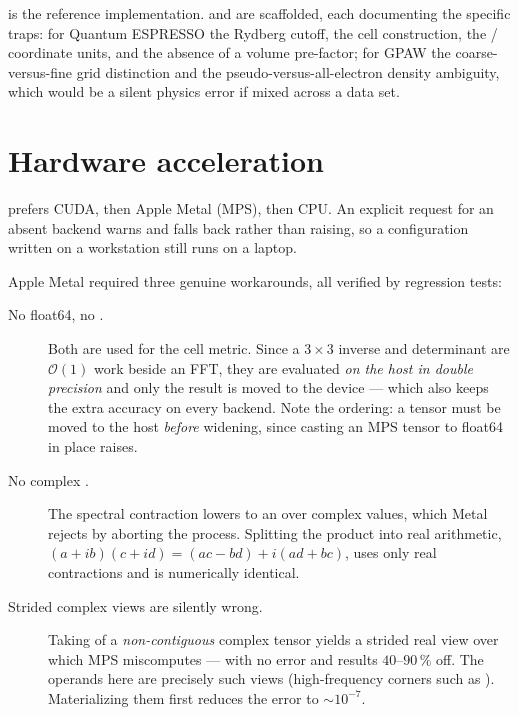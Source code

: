  is the reference implementation.
 and  are scaffolded, each
documenting the specific traps: for Quantum ESPRESSO the Rydberg cutoff,
the  cell construction, the / coordinate
units, and the absence of a volume pre-factor; for GPAW the coarse-versus-fine
grid distinction and the pseudo-versus-all-electron density ambiguity, which
would be a silent physics error if mixed across a data set.

\section{Hardware acceleration}
\label{sec:hardware}

 prefers CUDA, then Apple Metal (MPS), then CPU. An explicit request for an absent backend warns and falls
back rather than raising, so a configuration written on a workstation still runs
on a laptop.

Apple Metal required three genuine workarounds, all verified by regression
tests:

\begin{description}
  \item[No float64, no .] Both are used for the cell metric.
    Since a $3\times3$ inverse and determinant are $\mathcal{O}(1)$ work beside
    an FFT, they are evaluated \emph{on the host in double precision} and only
    the result is moved to the device --- which also keeps the extra accuracy
    on every backend. Note the ordering: a tensor must be moved to the host
    \emph{before} widening, since casting an MPS tensor to float64 in place
    raises.
  \item[No complex .] The spectral contraction lowers to an
     over complex values, which Metal rejects by aborting the
    process. Splitting the product into real arithmetic,
    $(a+ib)(c+id) = (ac-bd) + i(ad+bc)$, uses only real contractions and is
    numerically identical.
  \item[Strided complex views are silently wrong.] Taking  of a
    \emph{non-contiguous} complex tensor yields a strided real view over which
    MPS miscomputes  --- with no error and results $40$--$90\,\%$
    off. The operands here are precisely such views (high-frequency corners
    such as ). Materializing them first
    reduces the error to $\sim10^{-7}$.
\end{description}

